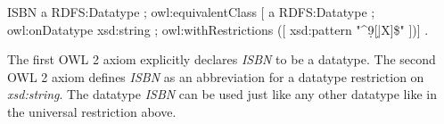 \documentclass{llncs}
\newcommand{\ms}[1]{\texttt{#1}}
\newcommand{\tb}[1]{\todo[size=\small, color=green!40]{\textbf{Thomas:} #1}}
\newcommand{\er}[1]{\todo[size=\small, color=red!40]{\textbf{Erman:} #1}}
\begin{document}
\begin{ex}
ISBN a RDFS:Datatype ; owl:equivalentClass [ a RDFS:Datatype ;
    owl:onDatatype xsd:string ; owl:withRestrictions ([ xsd:pattern "^\d{9}[\d|X]\$" ])] .
\end{ex}

The first OWL 2 axiom explicitly declares {\em ISBN} to be a datatype. %
The second OWL 2 axiom defines {\em ISBN} as an abbreviation for a datatype restriction on {\em xsd:string}. 
The datatype {\em ISBN} can be used just like any other datatype like in the universal restriction above.
\end{document}
